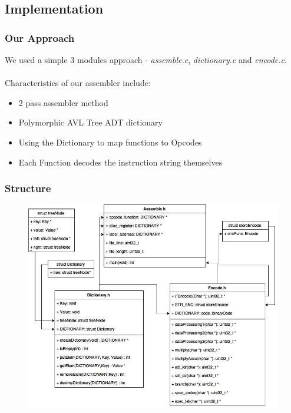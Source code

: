 \documentclass{beamer}
\begin{document}
\subsection{Implementation}

\begin{frame}
\frametitle{Our Approach}

We used a simple 3 modules approach - \textit{assemble.c}, \textit{dictionary.c} and \textit{encode.c}. 
\\~\\

Characteristics of our assembler include: 
\begin{itemize}
\item 2 pass assembler method

\item Polymorphic AVL Tree ADT dictionary

\item Using the Dictionary to map functions to Opcodes

\item Each Function decodes the instruction string themselves

\end{itemize}

\end{frame}


\begin{frame}
\frametitle{Structure}

\begin{figure}[c]
\includegraphics[width=0.9\linewidth]{Images/Assembler_XML.jpg}
\end{figure}


\end{frame}
\end{document}
